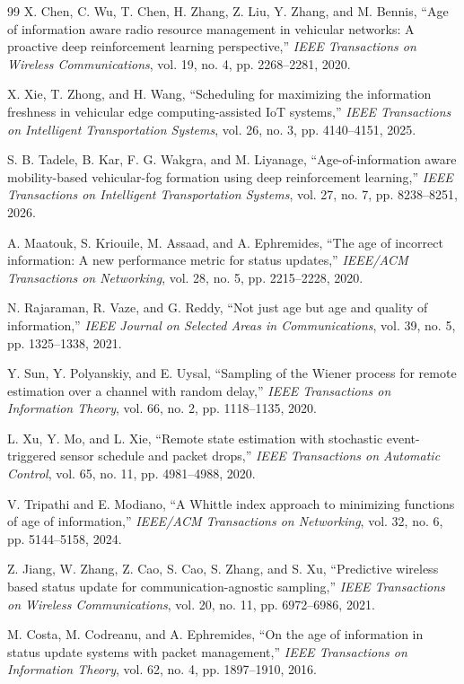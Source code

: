 \documentclass[journal]{IEEEtran}
\begin{document}
\begin{thebibliography}{99}
 X. Chen, C. Wu, T. Chen, H. Zhang, Z. Liu, Y. Zhang, and M. Bennis, ``Age of information aware radio resource management in vehicular networks: A proactive deep reinforcement learning perspective,'' \emph{IEEE Transactions on Wireless Communications}, vol. 19, no. 4, pp. 2268--2281, 2020.

 X. Xie, T. Zhong, and H. Wang, ``Scheduling for maximizing the information freshness in vehicular edge computing-assisted IoT systems,'' \emph{IEEE Transactions on Intelligent Transportation Systems}, vol. 26, no. 3, pp. 4140--4151, 2025.

 S. B. Tadele, B. Kar, F. G. Wakgra, and M. Liyanage, ``Age-of-information aware mobility-based vehicular-fog formation using deep reinforcement learning,'' \emph{IEEE Transactions on Intelligent Transportation Systems}, vol. 27, no. 7, pp. 8238--8251, 2026.

 A. Maatouk, S. Kriouile, M. Assaad, and A. Ephremides, ``The age of incorrect information: A new performance metric for status updates,'' \emph{IEEE/ACM Transactions on Networking}, vol. 28, no. 5, pp. 2215--2228, 2020.

 N. Rajaraman, R. Vaze, and G. Reddy, ``Not just age but age and quality of information,'' \emph{IEEE Journal on Selected Areas in Communications}, vol. 39, no. 5, pp. 1325--1338, 2021.

 Y. Sun, Y. Polyanskiy, and E. Uysal, ``Sampling of the Wiener process for remote estimation over a channel with random delay,'' \emph{IEEE Transactions on Information Theory}, vol. 66, no. 2, pp. 1118--1135, 2020.

 L. Xu, Y. Mo, and L. Xie, ``Remote state estimation with stochastic event-triggered sensor schedule and packet drops,'' \emph{IEEE Transactions on Automatic Control}, vol. 65, no. 11, pp. 4981--4988, 2020.

 V. Tripathi and E. Modiano, ``A Whittle index approach to minimizing functions of age of information,'' \emph{IEEE/ACM Transactions on Networking}, vol. 32, no. 6, pp. 5144--5158, 2024.

 Z. Jiang, W. Zhang, Z. Cao, S. Cao, S. Zhang, and S. Xu, ``Predictive wireless based status update for communication-agnostic sampling,'' \emph{IEEE Transactions on Wireless Communications}, vol. 20, no. 11, pp. 6972--6986, 2021.

 M. Costa, M. Codreanu, and A. Ephremides, ``On the age of information in status update systems with packet management,'' \emph{IEEE Transactions on Information Theory}, vol. 62, no. 4, pp. 1897--1910, 2016.


\end{thebibliography}
\end{document}
